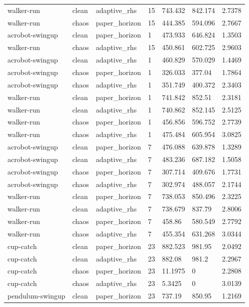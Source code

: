 \begin{tabular}{lllllll}
walker-run & clean & adaptive\_rhs & 15 & 743.432 & 842.174 & 2.7378 \\
walker-run & chaos & paper\_horizon & 15 & 444.385 & 594.096 & 2.7667 \\
acrobot-swingup & clean & paper\_horizon & 1 & 473.933 & 646.824 & 1.3503 \\
walker-run & chaos & adaptive\_rhs & 15 & 450.861 & 602.725 & 2.9603 \\
acrobot-swingup & clean & adaptive\_rhs & 1 & 460.829 & 570.029 & 1.4469 \\
acrobot-swingup & chaos & paper\_horizon & 1 & 326.033 & 377.04 & 1.7864 \\
acrobot-swingup & chaos & adaptive\_rhs & 1 & 351.749 & 400.372 & 2.3403 \\
walker-run & clean & paper\_horizon & 1 & 741.842 & 852.51 & 2.3181 \\
walker-run & clean & adaptive\_rhs & 1 & 740.862 & 852.145 & 2.5125 \\
walker-run & chaos & paper\_horizon & 1 & 456.856 & 596.752 & 2.7739 \\
walker-run & chaos & adaptive\_rhs & 1 & 475.484 & 605.954 & 3.0825 \\
acrobot-swingup & clean & paper\_horizon & 7 & 476.088 & 639.878 & 1.3289 \\
acrobot-swingup & clean & adaptive\_rhs & 7 & 483.236 & 687.182 & 1.5058 \\
acrobot-swingup & chaos & paper\_horizon & 7 & 307.714 & 409.676 & 1.7731 \\
acrobot-swingup & chaos & adaptive\_rhs & 7 & 302.974 & 488.057 & 2.1744 \\
walker-run & clean & paper\_horizon & 7 & 738.053 & 850.496 & 2.3225 \\
walker-run & clean & adaptive\_rhs & 7 & 738.679 & 837.79 & 2.8006 \\
walker-run & chaos & paper\_horizon & 7 & 458.86 & 580.549 & 2.7792 \\
walker-run & chaos & adaptive\_rhs & 7 & 455.354 & 631.268 & 3.0344 \\
cup-catch & clean & paper\_horizon & 23 & 882.523 & 981.95 & 2.0492 \\
cup-catch & clean & adaptive\_rhs & 23 & 882.08 & 981.2 & 2.2967 \\
cup-catch & chaos & paper\_horizon & 23 & 11.1975 & 0 & 2.2808 \\
cup-catch & chaos & adaptive\_rhs & 23 & 5.3425 & 0 & 3.0139 \\
pendulum-swingup & clean & paper\_horizon & 23 & 737.19 & 850.95 & 1.2169 \\

\end{tabular}
